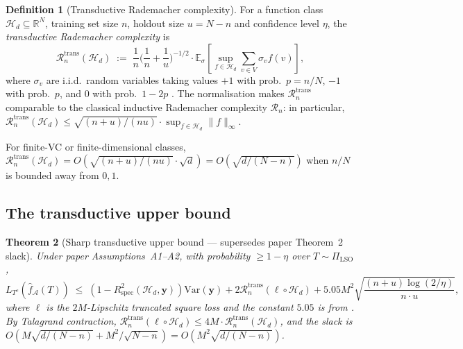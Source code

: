 \documentclass[11pt,a4paper]{article}
\theoremstyle{plain}
\newtheorem{theorem}{Theorem}
\theoremstyle{definition}
\newtheorem{definition}[theorem]{Definition}
\theoremstyle{remark}
\newcommand{\by}{\mathbf{y}}
\newcommand{\E}{\mathbb{E}}
\newcommand{\R}{\mathbb{R}}
\newcommand{\Var}{\mathrm{Var}}
\newcommand{\Rspec}{R^2_{\mathrm{spec}}}
\newcommand{\Acal}{\mathcal{A}}
\newcommand{\Hcal}{\mathcal{H}}
\newcommand{\Rcal}{\mathcal{R}}
\begin{document}
\begin{definition}[Transductive Rademacher complexity]
\label{def:trans-rademacher}
For a function class $\Hcal_d \subseteq \R^N$, training set size $n$,
holdout size $u = N - n$ and confidence level $\eta$, the
\emph{transductive Rademacher complexity} is
\begin{equation}
    \Rcal_n^{\mathrm{trans}}(\Hcal_d)
    \;:=\; \frac{1}{n}\Big(\frac{1}{n} + \frac{1}{u}\Big)^{-1/2}
        \cdot \E_\sigma\!\left[\sup_{f \in \Hcal_d} \sum_{v \in V} \sigma_v f(v)\right],
    \label{eq:trans-rademacher}
\end{equation}
where $\sigma_v$ are i.i.d.\ random variables taking values
$+1$ with prob.\ $p = n/N$, $-1$ with prob.\ $p$, and $0$ with prob.\
$1 - 2p$ \citep[][\S 3]{ElYanivPechyony2006}.  The normalisation
makes $\Rcal_n^{\mathrm{trans}}$ comparable to the classical
inductive Rademacher complexity $\Rcal_n$: in particular,
$\Rcal_n^{\mathrm{trans}}(\Hcal_d) \leq \sqrt{(n+u)/(nu)} \cdot
\sup_{f \in \Hcal_d} \|f\|_\infty$.
\end{definition}

For finite-VC or finite-dimensional classes,
$\Rcal_n^{\mathrm{trans}}(\Hcal_d) = O(\sqrt{(n+u)/(nu)} \cdot \sqrt{d}) =
O(\sqrt{d/(N-n)})$ when $n/N$ is bounded away from $0, 1$.

\subsection{The transductive upper bound}

\begin{theorem}[Sharp transductive upper bound --- supersedes paper Theorem~2 slack]
\label{thm:transductive-upper}
Under paper Assumptions~A1--A2, with probability $\geq 1 - \eta$ over
$T \sim \Pi_{\mathrm{LSO}}$,
\begin{equation}
    L_{T^c}(\hat f_\Acal(T))
    \;\leq\; (1 - \Rspec(\Hcal_d, \by)) \Var(\by)
        + 2 \Rcal_n^{\mathrm{trans}}(\ell \circ \Hcal_d)
        + 5.05 M^2 \sqrt{\frac{(n + u) \log(2/\eta)}{n \cdot u}},
    \label{eq:transductive-upper}
\end{equation}
where $\ell$ is the $2M$-Lipschitz truncated square loss and
the constant $5.05$ is from \citet[][Theorem~1]{ElYanivPechyony2006}.
By Talagrand contraction, $\Rcal_n^{\mathrm{trans}}(\ell \circ \Hcal_d)
\leq 4 M \cdot \Rcal_n^{\mathrm{trans}}(\Hcal_d)$, and the slack is
$O(M\sqrt{d/(N-n)} + M^2/\sqrt{N-n}) = O(M^2 \sqrt{d/(N-n)})$.
\end{theorem}
\end{document}

